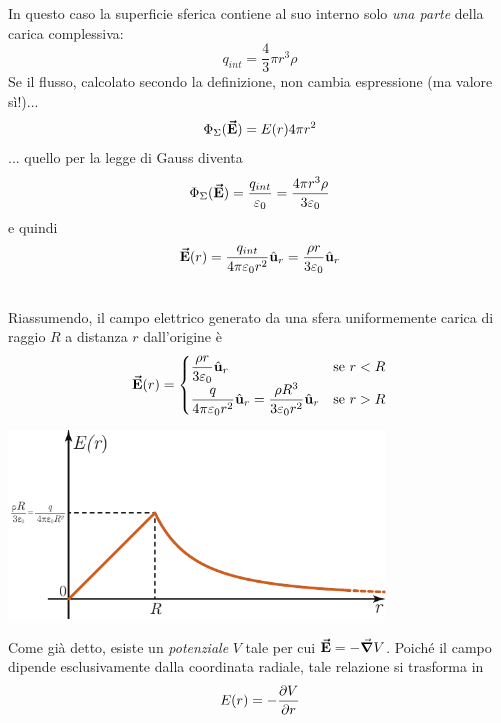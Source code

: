 \begin{minipage}{0.54\textwidth}
	In questo caso la superficie sferica contiene al suo interno solo \textit{una parte} della carica complessiva:
	\begin{equation*}
		q_{int}=\frac{4}{3}\pi r^3\rho
	\end{equation*}
	Se il flusso, calcolato secondo la definizione, non cambia espressione (ma valore sì!)...
	\begin{equation*}
		\Phi_{\Sigma}(\vb*{\va{E}})=E(r)4\pi r^2
	\end{equation*}
	... quello per la legge di Gauss diventa
	\begin{equation*}
		\Phi_{\Sigma}(\vb*{\va{E}})=\frac{q_{int}}{\varepsilon_0}=\frac{4 \pi r^3\rho}{3\varepsilon_0}
	\end{equation*}
	e quindi
	\begin{equation}
		\vb*{\va{E}}(r)=\frac{q_{int}}{4\pi\varepsilon_0 r^2}\hat{\mathbf{u}}_r=\frac{\rho r}{3\varepsilon_0}\hat{\mathbf{u}}_r
	\end{equation}
\end{minipage}\\
Riassumendo, il campo elettrico generato da una sfera uniformemente carica di raggio $R$ a distanza $r$ dall'origine è
\begin{equation}
	\vba{E}(r)=\begin{cases}
		\displaystyle\frac{\rho r}{3\epsilon_0}\vbh{u}_r&\text{se}\ r< R\\
		\displaystyle\frac{q}{4\pi\epsilon_0 r^2}\vbh{u}_r=\frac{\rho R^3}{3\epsilon_0r^2}\vbh{u}_r &\text{se}\ r> R
	\end{cases}
\end{equation}
\begin{center}
	\includegraphics[width=0.75\textwidth]{images/chp2sferagraf1.pdf}
\end{center}
Come già detto, esiste un \textit{potenziale} $V$ tale per cui $\vb*{\va{E}}=-\grad{V}$. Poiché il campo dipende esclusivamente dalla coordinata radiale, tale relazione si trasforma in
\begin{equation*}
	E(r)=-\pdv{V}{r}
\end{equation*}
